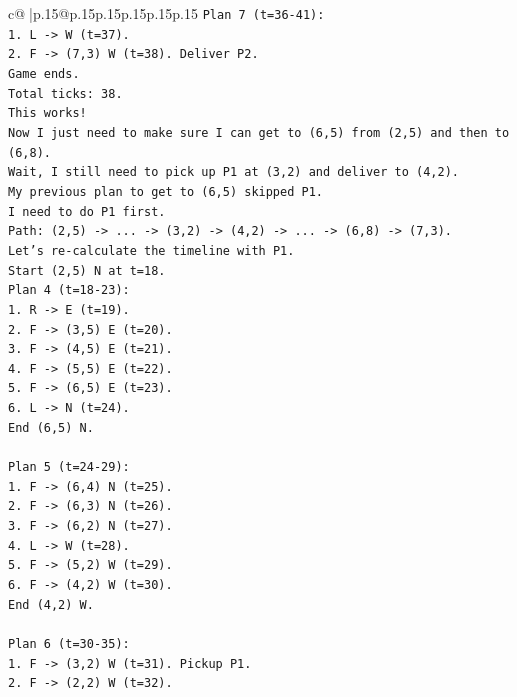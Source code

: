 \documentclass{article}
\begin{document}
{\begin{supertabular}{c@{$\;$}|p{.15\linewidth}@{}p{.15\linewidth}p{.15\linewidth}p{.15\linewidth}p{.15\linewidth}p{.15\linewidth}}
{{{\texttt{Plan 7 (t=36{-}41):} \\
\texttt{1. L {-}> W (t=37).} \\
\texttt{2. F {-}> (7,3) W (t=38). Deliver P2.} \\
\texttt{Game ends.} \\
\texttt{Total ticks: 38.} \\
\texttt{This works!} \\
\texttt{Now I just need to make sure I can get to (6,5) from (2,5) and then to (6,8).} \\
\texttt{Wait, I still need to pick up P1 at (3,2) and deliver to (4,2).} \\
\texttt{My previous plan to get to (6,5) skipped P1.} \\
\texttt{I need to do P1 first.} \\
\texttt{Path: (2,5) {-}> ... {-}> (3,2) {-}> (4,2) {-}> ... {-}> (6,8) {-}> (7,3).} \\
\texttt{Let's re{-}calculate the timeline with P1.} \\
\texttt{Start (2,5) N at t=18.} \\
\texttt{Plan 4 (t=18{-}23):} \\
\texttt{1. R {-}> E (t=19).} \\
\texttt{2. F {-}> (3,5) E (t=20).} \\
\texttt{3. F {-}> (4,5) E (t=21).} \\
\texttt{4. F {-}> (5,5) E (t=22).} \\
\texttt{5. F {-}> (6,5) E (t=23).} \\
\texttt{6. L {-}> N (t=24).} \\
\texttt{End (6,5) N.} \\
\\ 
\texttt{Plan 5 (t=24{-}29):} \\
\texttt{1. F {-}> (6,4) N (t=25).} \\
\texttt{2. F {-}> (6,3) N (t=26).} \\
\texttt{3. F {-}> (6,2) N (t=27).} \\
\texttt{4. L {-}> W (t=28).} \\
\texttt{5. F {-}> (5,2) W (t=29).} \\
\texttt{6. F {-}> (4,2) W (t=30).} \\
\texttt{End (4,2) W.} \\
\\ 
\texttt{Plan 6 (t=30{-}35):} \\
\texttt{1. F {-}> (3,2) W (t=31). Pickup P1.} \\
\texttt{2. F {-}> (2,2) W (t=32).} \\
}}}
\end{supertabular}}
\end{document}
